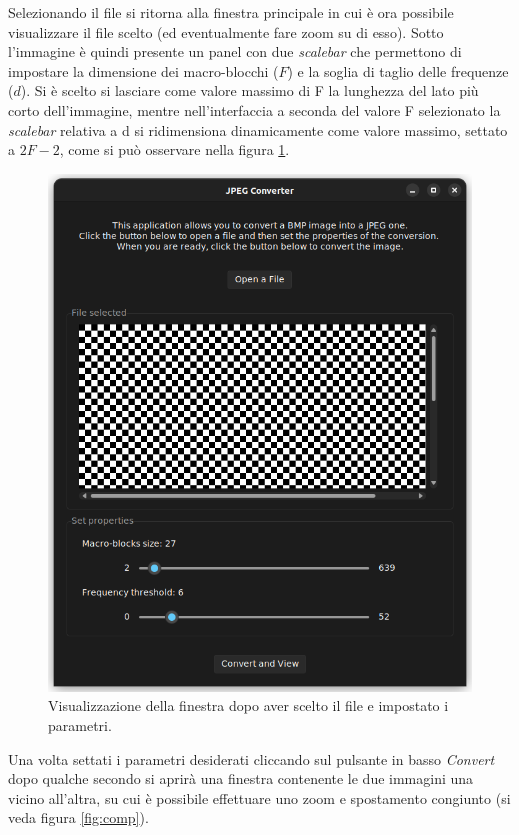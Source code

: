\documentclass[12pt]{article}
\begin{document}
Selezionando il file si ritorna alla finestra principale in cui è ora possibile visualizzare il file scelto (ed eventualmente fare zoom su di esso). Sotto l'immagine è quindi presente un panel con due \textit{scalebar} che permettono di impostare la dimensione dei macro-blocchi ($F$) e la soglia di taglio delle frequenze ($d$). Si è scelto si lasciare come valore massimo di F la lunghezza del lato più corto dell'immagine, mentre nell'interfaccia a seconda del valore F selezionato la \textit{scalebar} relativa a d si ridimensiona dinamicamente come valore massimo, settato a $2F-2$, come si può osservare nella figura \ref{fig:tune}.

\begin{figure}[!ht]
    \begin{center}
    \includegraphics[scale=0.4]{images/tune.png}
    \caption{Visualizzazione della finestra dopo aver scelto il file e impostato i parametri.}
    \label{fig:tune}
    \end{center}
\end{figure}

Una volta settati i parametri desiderati cliccando sul pulsante in basso \textit{Convert} dopo qualche secondo si aprirà una finestra contenente le due immagini una vicino all'altra, su cui è possibile effettuare uno zoom e spostamento congiunto (si veda figura \ref{fig:comp}).
\end{document}
